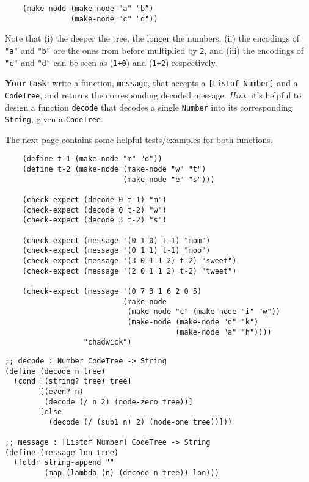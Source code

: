 \documentclass[12pt]{article}                   %
\newenvironment{solution}{}{}
\newcommand\code[1]{\texttt{#1}}
\begin{document}
\begin{problem}
\begin{verbatim}
    (make-node (make-node "a" "b")
               (make-node "c" "d"))
\end{verbatim}

\noindent Note that (i) the deeper the tree, the longer the numbers,
(ii) the encodings of \code{"a"} and \code{"b"} are the ones from
before multiplied by \code{2}, and (iii) the encodings of \code{"c"} and
\code{"d"} can be seen as (\code{1+0}) and (\code{1+2}) respectively.

\bigskip\noindent \textbf{Your task}: write a function,
\code{message}, that accepts a \code{[Listof Number]} and a
\code{CodeTree}, and returns the corresponding decoded message.
\textit{Hint}: it's helpful to design a function \code{decode} that
decodes a single \code{Number} into its corresponding \code{String},
given a \code{CodeTree}.

\bigskip\noindent The next page contains some helpful tests/examples
for both functions.
\newpage
\begin{verbatim}
    (define t-1 (make-node "m" "o"))
    (define t-2 (make-node (make-node "w" "t")
                           (make-node "e" "s")))

    (check-expect (decode 0 t-1) "m")
    (check-expect (decode 0 t-2) "w")
    (check-expect (decode 3 t-2) "s")

    (check-expect (message '(0 1 0) t-1) "mom")
    (check-expect (message '(0 1 1) t-1) "moo")
    (check-expect (message '(3 0 1 1 2) t-2) "sweet")
    (check-expect (message '(2 0 1 1 2) t-2) "tweet")

    (check-expect (message '(0 7 3 1 6 2 0 5)
                           (make-node
                            (make-node "c" (make-node "i" "w"))
                            (make-node (make-node "d" "k")
                                       (make-node "a" "h"))))
                  "chadwick")
\end{verbatim}

\begin{solution}
\begin{verbatim}
;; decode : Number CodeTree -> String
(define (decode n tree)
  (cond [(string? tree) tree]
        [(even? n)
         (decode (/ n 2) (node-zero tree))]
        [else
          (decode (/ (sub1 n) 2) (node-one tree))]))

;; message : [Listof Number] CodeTree -> String
(define (message lon tree)
  (foldr string-append ""
         (map (lambda (n) (decode n tree)) lon)))
\end{verbatim}
\end{solution}
\end{problem}
\end{document}
